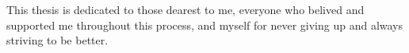\vspace{7cm}

\begin{center}
This thesis is dedicated to those dearest to me, everyone who belived and supported me throughout this process, and myself for never giving up and always striving to be better.	
		
\end{center}

